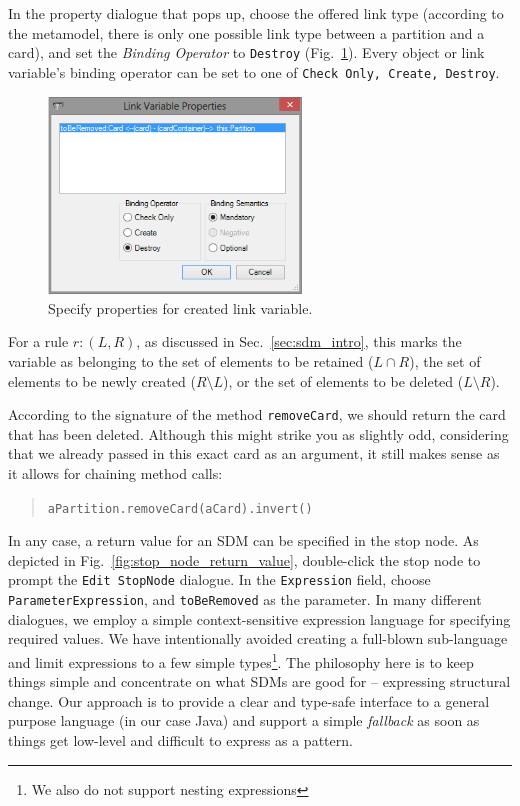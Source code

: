 In the property dialogue that pops up, choose the offered link type (according to the metamodel, there is only one possible link type between a partition and a 
card), and set the \emph{Binding Operator} to \texttt{Destroy} (Fig.~\ref{fig:link_variable_properties}). 
Every object or link variable's binding operator can be set to one of \texttt{Check Only, Create, Destroy}.

\begin{figure}[htp] 
\begin{center} 
 \includegraphics[width=0.6\textwidth]{pics/sdmBilder/removeCard/sdm12RAW.png}
  \caption{Specify properties for created link variable.}  
  \label{fig:link_variable_properties}
\end{center}
\end{figure}



For a rule $r: (L, R)$, as discussed in Sec.~\ref{sec:sdm_intro}, this marks the variable as belonging to the set of elements to be retained ($L\cap R$), the set of elements to be newly created ($R\setminus L$), or the set of elements to be deleted ($L\setminus R$).
 
According to the signature of the method \texttt{removeCard}, we should return the card that has been deleted.  
Although this might strike you as slightly odd, considering that we already passed in this exact card as an argument, it still makes sense as it allows for chaining method calls: \begin{quote}\texttt{aPartition.removeCard(aCard).invert()}\end{quote}
In any case, a return value for an SDM can be specified in the stop node.
As depicted in Fig.~\ref{fig:stop_node_return_value}, double-click the stop node to prompt the \texttt{Edit StopNode} dialogue.
In the \texttt{Expression} field, choose \texttt{ParameterExpression}, and \texttt{toBeRemoved} as the parameter.  
In many different dialogues, we employ a simple context-sensitive expression language for specifying required values.  
We have intentionally avoided creating a full-blown sub-language and limit expressions to a few simple types\footnote{We also do not support nesting expressions}.  
The philosophy here is to keep things simple and concentrate on what SDMs are good for -- expressing structural change.  
Our approach is to provide a clear and type-safe interface to a general purpose language (in our case Java) and support a simple \emph{fallback} as soon as things get low-level and difficult to express as a pattern.  

